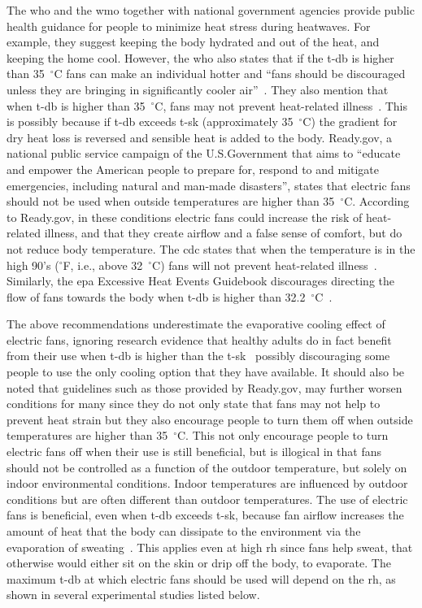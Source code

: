 The \ac{who} and the \ac{wmo} together with national government agencies provide public health guidance for people to minimize heat stress during heatwaves.
For example, they suggest keeping the body hydrated and out of the heat, and keeping the home cool.
However, the \ac{who} also states that if the \ac{t-db} is higher than 35~$^{\circ}$C fans can make an individual hotter and ``fans should be discouraged unless they are bringing in significantly cooler air''~\cite{WMO2015}.
They also mention that when \ac{t-db} is higher than 35~$^{\circ}$C, fans may not prevent heat-related illness~\cite{HeatandH28:online}.
This is possibly because if \ac{t-db} exceeds \ac{t-sk} (approximately 35~$^{\circ}$C) the gradient for dry heat loss is reversed and sensible heat is added to the body.
Ready.gov, a national public service campaign of the U.S.\@ Government that aims to ``educate and empower the American people to prepare for, respond to and mitigate emergencies, including natural and man-made disasters'', states that electric fans should not be used when outside temperatures are higher than 35~$^{\circ}$C\@.
According to Ready.gov, in these conditions electric fans could increase the risk of heat-related illness, and that they create airflow and a false sense of comfort, but do not reduce body temperature.
The \ac{cdc} states that when the temperature is in the high 90's ($^{\circ}$F, i.e., above 32~$^{\circ}$C) fans will not prevent heat-related illness~\cite{ExtremeH66:online}.
Similarly, the \ac{epa} Excessive Heat Events Guidebook discourages directing the flow of fans towards the body when \ac{t-db} is higher than 32.2~$^{\circ}$C~\cite{UnitedStatesEnvironmentalProtectionAgency2006}.

The above recommendations underestimate the evaporative cooling effect of electric fans, ignoring research evidence that healthy adults do in fact benefit from their use when \ac{t-db} is higher than the \ac{t-sk}~\cite{Rate2015, Jay2015, Jay2019a, Rate2015, Gagnon2017} possibly discouraging some people to use the only cooling option that they have available.
It should also be noted that guidelines such as those provided by Ready.gov, may further worsen conditions for many since they do not only state that fans may not help to prevent heat strain but they also encourage people to turn them off when outside temperatures are higher than 35~$^{\circ}$C\@.
This not only encourage people to turn electric fans off when their use is still beneficial, but is illogical in that fans should not be controlled as a function of the outdoor temperature, but solely on indoor environmental conditions. 
Indoor temperatures are influenced by outdoor conditions but are often different than outdoor temperatures. 
The use of electric fans is beneficial, even when \ac{t-db} exceeds \ac{t-sk}, because fan airflow increases the amount of heat that the body can dissipate to the environment via the evaporation of sweating~\cite{Jay2015}.
This applies even at high \ac{rh} since fans help sweat, that otherwise would either sit on the skin or drip off the body, to evaporate.
The maximum \ac{t-db} at which electric fans should be used will depend on the \ac{rh}, as shown in several experimental studies listed below.

